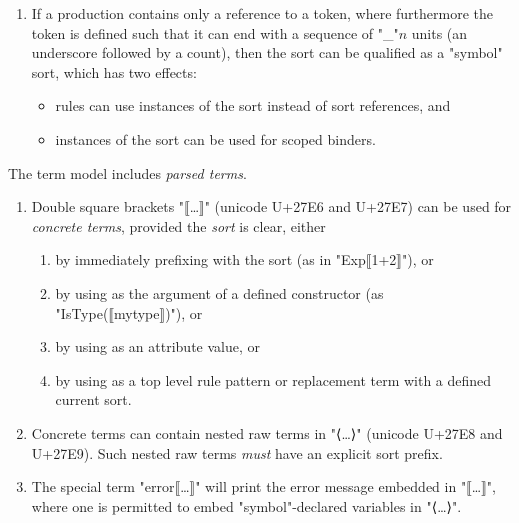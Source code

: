 \documentclass[11pt]{article} %
\begin{document}
\begin{manual}
\begin{enumerate}
  \item If a production contains only a reference to a token, where furthermore the token is defined
    such that it can end with a sequence of "_"$n$ units (an underscore followed by a count), then
    the sort can be qualified as a "symbol" sort, which has two effects:
    \begin{itemize}
    \item rules can use instances of the sort instead of sort references, and
    \item instances of the sort can be used for scoped binders.
    \end{itemize}

  \end{enumerate}
\end{manual}

\begin{manual}\label{man:parsed}
  The term model includes \emph{parsed terms}.
  \begin{enumerate}

  \item Double square brackets "⟦…⟧" (unicode U+27E6 and U+27E7) can be used for \emph{concrete
      terms}, provided the \emph{sort} is clear, either
    \begin{enumerate}
    \item by immediately prefixing with the sort (as in "Exp⟦1+2⟧"), or
    \item by using as the argument of a defined constructor (as "IsType(⟦mytype⟧)"), or
    \item by using as an attribute value, or
    \item by using as a top level rule pattern or replacement term with a defined current sort.
    \end{enumerate}

  \item Concrete terms can contain nested raw terms in "⟨…⟩" (unicode U+27E8 and U+27E9). Such
    nested raw terms \emph{must} have an explicit sort prefix.

  \item The special term "error⟦…⟧" will print the error message embedded in "⟦…⟧", where one is
    permitted to embed "symbol"-declared variables in "⟨…⟩".

  \end{enumerate}

\end{manual}
\end{document}

